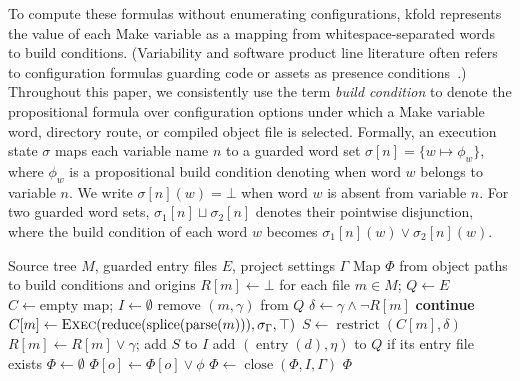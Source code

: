 \documentclass[acmsmall]{acmart}
\newcommand{\tool}{\textsf{kfold}\xspace}
\newcounter{none}
\begin{document}
To compute these formulas without enumerating configurations, \tool represents the value of each Make variable as a mapping from whitespace-separated words to build conditions.
(Variability and software product line literature often refers to configuration formulas guarding code or assets as presence conditions~\cite{liebig2010analysis,thum2014potential,berger2013variability,apel2013feature}.)
Throughout this paper, we consistently use the term \emph{build condition} to denote the propositional formula over configuration options under which a Make variable word, directory route, or compiled object file is selected.
Formally, an execution state $\sigma$ maps each variable name $n$ to a guarded word set $\sigma[n] = \{w \mapsto \phi_w\}$, where $\phi_w$ is a propositional build condition denoting when word $w$ belongs to variable $n$.
We write $\sigma[n](w) = \bot$ when word $w$ is absent from variable $n$.
For two guarded word sets, $\sigma_1[n] \sqcup \sigma_2[n]$ denotes their pointwise disjunction, where the build condition of each word $w$ becomes $\sigma_1[n](w) \lor \sigma_2[n](w)$.

\begin{algorithm}[t]
\caption{Extract guarded Kbuild object conditions}
\label{alg:extract}
\begin{algorithmic}[1]
\Require Source tree $M$, guarded entry files $E$, project settings $\Gamma$
\Ensure Map $\Phi$ from object paths to build conditions and origins
\State $R[m] \gets \bot$ for each file $m \in M$; $Q \gets E$
\State $C \gets \text{empty map}$; $I \gets \emptyset$
  \State remove $(m, \gamma)$ from $Q$
  \State $\delta \gets \gamma \land \neg R[m]$
    \State \textbf{continue}
  \EndIf
    \State $C[m] \gets \textsc{Exec}(\operatorname{reduce}(\operatorname{splice}(\operatorname{parse}(m))), \sigma_\Gamma, \top)$
  \EndIf
  \State $S \gets \operatorname{restrict}(C[m], \delta)$
  \State $R[m] \gets R[m] \lor \gamma$; add $S$ to $I$
    \State add $(\operatorname{entry}(d), \eta)$ to $Q$ if its entry file exists
  \EndFor
\EndWhile
\State $\Phi \gets \emptyset$
    \State $\Phi[o] \gets \Phi[o] \lor \phi$ 
  \EndFor
\EndFor
\State $\Phi \gets \operatorname{close}(\Phi, I, \Gamma)$ 
\State \Return $\Phi$
\end{algorithmic}
\end{algorithm}
\end{document}
